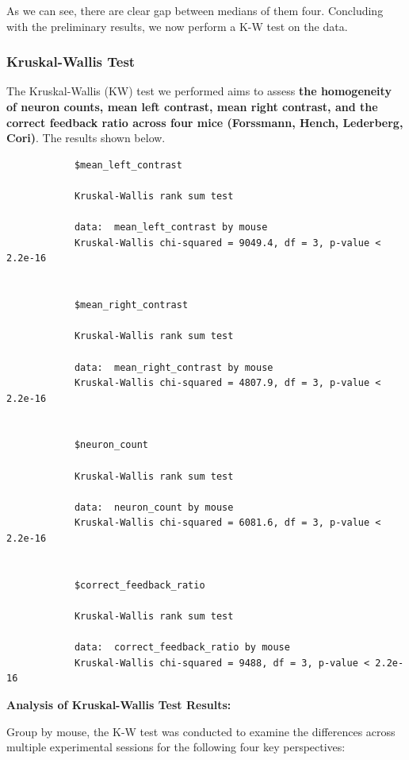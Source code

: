 \documentclass{article}
\begin{document}
	\clearpage
	\par As we can see, there are clear gap between medians of them four. Concluding with the preliminary results, we now perform a K-W test on the data.
	\subsubsection{Kruskal-Wallis Test}
	\par The Kruskal-Wallis (KW) test we performed aims to assess \textbf{the homogeneity of neuron counts, mean left contrast, mean right contrast, and the correct feedback ratio across four mice (Forssmann, Hench, Lederberg, Cori)}. The results shown below.
	\begin{framed}
		\begin{verbatim}
			$mean_left_contrast
			
			Kruskal-Wallis rank sum test
			
			data:  mean_left_contrast by mouse
			Kruskal-Wallis chi-squared = 9049.4, df = 3, p-value < 2.2e-16
			
			
			$mean_right_contrast
			
			Kruskal-Wallis rank sum test
			
			data:  mean_right_contrast by mouse
			Kruskal-Wallis chi-squared = 4807.9, df = 3, p-value < 2.2e-16
			
			
			$neuron_count
			
			Kruskal-Wallis rank sum test
			
			data:  neuron_count by mouse
			Kruskal-Wallis chi-squared = 6081.6, df = 3, p-value < 2.2e-16
			
			
			$correct_feedback_ratio
			
			Kruskal-Wallis rank sum test
			
			data:  correct_feedback_ratio by mouse
			Kruskal-Wallis chi-squared = 9488, df = 3, p-value < 2.2e-16
		\end{verbatim}
	\end{framed}
	\clearpage
	\textbf{Analysis of Kruskal-Wallis Test Results:}
	\par Group by mouse, the K-W test was conducted to examine the differences across multiple experimental sessions for the following four key perspectives:
\end{document}
